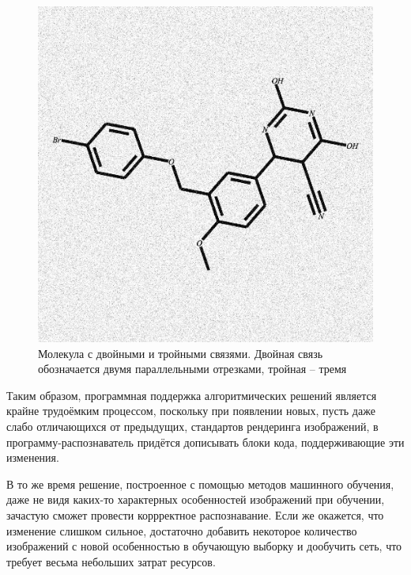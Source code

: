 \begin{figure}[h!] 
	\center
	\includegraphics [scale=0.45] {my_folder/images/23bonds}
	\caption{Молекула с двойными и тройными связями. Двойная связь обозначается двумя параллельными отрезками, тройная -- тремя} 
	\label{fig:23bond} 
\end{figure}

Таким образом, программная поддержка алгоритмических решений является крайне трудоёмким процессом, поскольку при появлении новых, пусть даже слабо отличающихся от предыдущих, стандартов рендеринга изображений, в программу-распознаватель придётся дописывать блоки кода, поддерживающие эти изменения.

В то же время решение, построенное с помощью методов машинного обучения, даже не видя каких-то характерных особенностей изображений при обучении, зачастую сможет провести коррректное распознавание. Если же окажется, что изменение слишком сильное, достаточно добавить некоторое количество изображений с новой особенностью в обучающую выборку и дообучить сеть, что требует весьма небольших затрат ресурсов.

